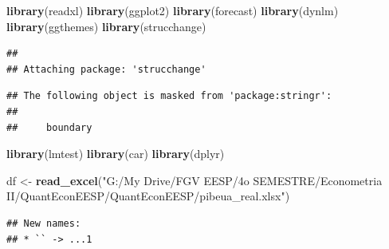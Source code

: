\documentclass[11pt, a4paper]{report}
\newenvironment{Shaded}{\begin{snugshade}}{\end{snugshade}}
\newcommand{\CommentTok}[1]{\textcolor[rgb]{0.56,0.35,0.01}{\textit{#1}}}
\newcommand{\DataTypeTok}[1]{\textcolor[rgb]{0.13,0.29,0.53}{#1}}
\newcommand{\DecValTok}[1]{\textcolor[rgb]{0.00,0.00,0.81}{#1}}
\newcommand{\KeywordTok}[1]{\textcolor[rgb]{0.13,0.29,0.53}{\textbf{#1}}}
\newcommand{\NormalTok}[1]{#1}
\newcommand{\OperatorTok}[1]{\textcolor[rgb]{0.81,0.36,0.00}{\textbf{#1}}}
\newcommand{\StringTok}[1]{\textcolor[rgb]{0.31,0.60,0.02}{#1}}
\theoremstyle{plain}
\theoremstyle{plain}
\theoremstyle{remark}
\begin{document}
\begin{Shaded}
\begin{Highlighting}[]
\KeywordTok{library}\NormalTok{(readxl)}
\KeywordTok{library}\NormalTok{(ggplot2)}
\KeywordTok{library}\NormalTok{(forecast)}
\KeywordTok{library}\NormalTok{(dynlm)}
\KeywordTok{library}\NormalTok{(ggthemes)}
\KeywordTok{library}\NormalTok{(strucchange)}
\end{Highlighting}
\end{Shaded}

\begin{verbatim}
## 
## Attaching package: 'strucchange'
\end{verbatim}

\begin{verbatim}
## The following object is masked from 'package:stringr':
## 
##     boundary
\end{verbatim}

\begin{Shaded}
\begin{Highlighting}[]
\KeywordTok{library}\NormalTok{(lmtest)}
\KeywordTok{library}\NormalTok{(car)}
\KeywordTok{library}\NormalTok{(dplyr)}

\NormalTok{df <-}\StringTok{ }\KeywordTok{read_excel}\NormalTok{(}\StringTok{"G:/My Drive/FGV EESP/4o SEMESTRE/Econometria II/QuantEconEESP/QuantEconEESP/pibeua_real.xlsx"}\NormalTok{)}
\end{Highlighting}
\end{Shaded}

\begin{verbatim}
## New names:
## * `` -> ...1
\end{verbatim}

\begin{Shaded}
\end{Shaded}
\end{document}
